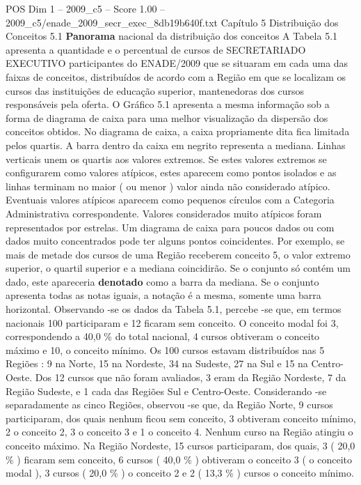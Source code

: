 \begin{textsample}{POS Dim 1 – 2009\_c5 – Score 1.00 – 2009\_c5/enade\_2009\_secr\_exec\_8db19b640f.txt}  \label{ex:f1_pos_146}
Capítulo 5 Distribuição dos Conceitos 5.1 \textbf{Panorama} nacional da distribuição dos conceitos A Tabela 5.1 apresenta a quantidade e o percentual de cursos de SECRETARIADO EXECUTIVO participantes do ENADE/2009 que se situaram em cada uma das faixas de conceitos, distribuídos de acordo com a Região em que se localizam os cursos das instituições de educação superior, mantenedoras dos cursos responsáveis pela oferta.
O Gráfico 5.1 apresenta a mesma informação sob a forma de diagrama de caixa para uma melhor visualização da dispersão dos conceitos obtidos.
No diagrama de caixa, a caixa propriamente dita fica limitada pelos quartis.
A barra dentro da caixa em negrito representa a mediana.
Linhas verticais unem os quartis aos valores extremos.
Se estes valores extremos se configurarem como valores atípicos, estes aparecem como pontos isolados e as linhas terminam no maior ( ou menor ) valor ainda não considerado atípico.
Eventuais valores atípicos aparecem como pequenos círculos com a Categoria Administrativa correspondente.
Valores considerados muito atípicos foram representados por estrelas.
Um diagrama de caixa para poucos dados ou com dados muito concentrados pode ter alguns pontos coincidentes.
Por exemplo, se mais de metade dos cursos de uma Região receberem conceito 5, o valor extremo superior, o quartil superior e a mediana coincidirão.
Se o conjunto só contém um dado, este apareceria \textbf{denotado} como a barra da mediana.
Se o conjunto apresenta todas as notas iguais, a notação é a mesma, somente uma barra horizontal.
Observando -se os dados da Tabela 5.1, percebe -se que, em termos nacionais 100 participaram e 12 ficaram sem conceito.
O conceito modal foi 3, correspondendo a 40,0 \% do total nacional, 4 cursos obtiveram o conceito máximo e 10, o conceito mínimo.
Os 100 cursos estavam distribuídos nas 5 Regiões : 9 na Norte, 15 na Nordeste, 34 na Sudeste, 27 na Sul e 15 na Centro-Oeste.
Dos 12 cursos que não foram avaliados, 3 eram da Região Nordeste, 7 da Região Sudeste, e 1 cada das Regiões Sul e Centro-Oeste.
Considerando -se separadamente as cinco Regiões, observou -se que, da Região Norte, 9 cursos participaram, dos quais nenhum ficou sem conceito, 3 obtiveram conceito mínimo, 2 o conceito 2, 3 o conceito 3 e 1 o conceito 4.
Nenhum curso na Região atingiu o conceito máximo.
Na Região Nordeste, 15 cursos participaram, dos quais, 3 ( 20,0 \% ) ficaram sem conceito, 6 cursos ( 40,0 \% ) obtiveram o conceito 3 ( o conceito modal ), 3 cursos ( 20,0 \% ) o conceito 2 e 2 ( 13,3 \% ) cursos o conceito mínimo.

\end{textsample}
